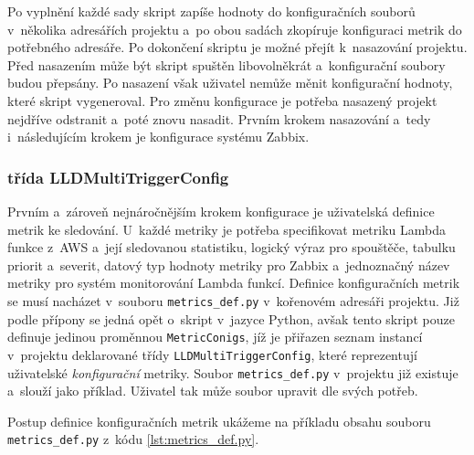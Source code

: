 \documentclass[czech, ing, kiv, he, iso690]{fasthesis}
\begin{document}
Po vyplnění každé sady skript zapíše hodnoty do konfiguračních souborů v~několika adresářích projektu a~po obou sadách zkopíruje konfiguraci metrik do potřebného adresáře. Po dokončení skriptu je možné přejít k~nasazování projektu. Před nasazením může být skript spuštěn libovolněkrát a~konfigurační soubory budou přepsány. Po nasazení však uživatel nemůže měnit konfigurační hodnoty, které skript vygeneroval. Pro změnu konfigurace je potřeba nasazený projekt nejdříve odstranit a~poté znovu nasadit. Prvním krokem nasazování a~tedy i~následujícím krokem je konfigurace systému Zabbix.

\subsubsection{třída LLDMultiTriggerConfig}
\label{sec:config-metric-class}

Prvním a~zároveň nejnáročnějším krokem konfigurace je uživatelská definice metrik ke sledování. U~každé metriky je potřeba specifikovat metriku Lambda funkce z~AWS a~její sledovanou statistiku, logický výraz pro spouštěče, tabulku priorit a~severit, datový typ hodnoty metriky pro Zabbix a~jednoznačný název metriky pro systém monitorování Lambda funkcí. Definice konfiguračních metrik se musí nacházet v~souboru \verb|metrics_def.py| v~kořenovém adresáři projektu. Již podle přípony se jedná opět o~skript v~jazyce Python, avšak tento skript pouze definuje jedinou proměnnou \verb|MetricConigs|, jíž je přiřazen seznam instancí v~projektu deklarované třídy \verb|LLDMultiTriggerConfig|, které reprezentují uživatelské \emph{konfigurační} metriky. Soubor \verb|metrics_def.py| v~projektu již existuje a~slouží jako příklad. Uživatel tak může soubor upravit dle svých potřeb.

Postup definice konfiguračních metrik ukážeme na příkladu obsahu souboru \verb|metrics_def.py| z~kódu \ref{lst:metrics_def.py}. 
\end{document}
